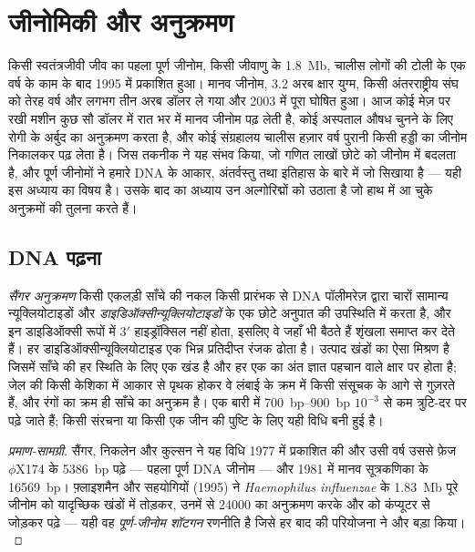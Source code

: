 \chapter{जीनोमिकी और अनुक्रमण}\label{ch:b3:genomics}

किसी स्वतंत्रजीवी जीव का पहला पूर्ण जीनोम, किसी जीवाणु के \qty{1.8}{Mb},
चालीस लोगों की टोली के एक वर्ष के काम के बाद 1995 में प्रकाशित हुआ।
मानव जीनोम, \num{3.2} अरब क्षार युग्म, किसी अंतरराष्ट्रीय संघ को तेरह
वर्ष और लगभग तीन अरब डॉलर ले गया और 2003 में पूरा घोषित हुआ। आज कोई
मेज़ पर रखी मशीन कुछ सौ डॉलर में रात भर में मानव जीनोम पढ़ लेती है, कोई
अस्पताल औषध चुनने के लिए रोगी के अर्बुद का अनुक्रमण करता है, और कोई
संग्रहालय चालीस हज़ार वर्ष पुरानी किसी हड्डी का जीनोम निकालकर पढ़ लेता
है। जिस तकनीक ने यह संभव किया, जो गणित लाखों छोटे  को जीनोम में
बदलता है, और पूर्ण जीनोमों ने हमारे DNA के आकार, अंतर्वस्तु तथा इतिहास
के बारे में जो सिखाया है --- यही इस अध्याय का विषय है। उसके बाद का
अध्याय उन अल्गोरिद्मों को उठाता है जो हाथ में आ चुके अनुक्रमों की तुलना
करते हैं।

\section{DNA पढ़ना}

\begin{definition}[शृंखला-समापन से अनुक्रमण]\label{def:b3:genomics:sanger}
\emph{सैंगर अनुक्रमण} किसी एकलड़ी साँचे की नकल किसी प्रारंभक से DNA
पॉलीमरेज़ द्वारा चारों सामान्य न्यूक्लियोटाइडों और
\emph{डाइडिऑक्सीन्यूक्लियोटाइडों} के एक छोटे अनुपात की उपस्थिति में
करता है, और इन डाइडिऑक्सी रूपों में 3$'$ हाइड्रॉक्सिल नहीं होता,
इसलिए वे जहाँ भी बैठते हैं शृंखला समाप्त कर देते हैं। हर
डाइडिऑक्सीन्यूक्लियोटाइड एक भिन्न प्रतिदीप्त रंजक ढोता है। उत्पाद
खंडों का ऐसा मिश्रण है जिसमें साँचे की हर स्थिति के लिए एक खंड है और
हर एक का अंत ज्ञात पहचान वाले क्षार पर होता है; जेल की किसी केशिका में
आकार से पृथक होकर वे लंबाई के क्रम में किसी संसूचक के आगे से गुज़रते
हैं, और रंगों का क्रम ही साँचे का अनुक्रम है। एक बारी में
\qtyrange{700}{900}{bp} $10^{-3}$ से कम त्रुटि-दर पर पढ़े जाते हैं; किसी
संरचना या किसी एक जीन की पुष्टि के लिए यही विधि बनी हुई है।
\end{definition}

\begin{proof}[प्रमाण-सामग्री]
सैंगर, निकलेन और कुल्सन ने यह विधि 1977 में प्रकाशित की और उसी वर्ष
उससे फ़ेज $\phi$X174 के \qty{5386}{bp} पढ़े --- पहला पूर्ण DNA जीनोम ---
और 1981 में मानव सूत्रकणिका के \qty{16569}{bp}। फ़्लाइशमैन और सहयोगियों
(1995) ने \emph{Haemophilus influenzae} के \qty{1.83}{Mb} पूरे जीनोम को
यादृच्छिक खंडों में तोड़कर, उनमें से \num{24000} का अनुक्रमण करके और
 को कंप्यूटर से जोड़कर पढ़े --- यही वह \emph{पूर्ण-जीनोम शॉटगन}
रणनीति है जिसे हर बाद की परियोजना ने और बड़ा किया।
\end{proof}

